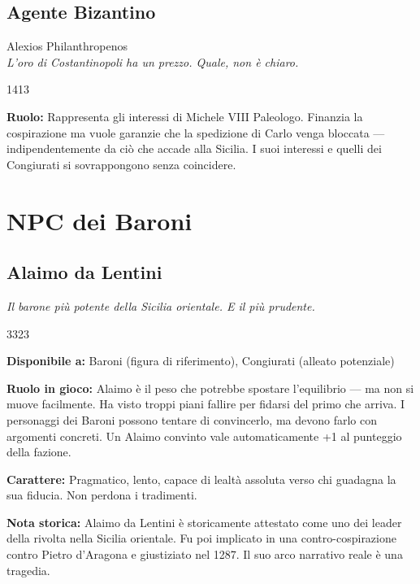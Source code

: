 \subsection{Agente Bizantino}
{\cinzel\footnotesize\color{grigionote} Alexios Philanthropenos}\\
\textit{L'oro di Costantinopoli ha un prezzo. Quale, non è chiaro.}

%
{1}{4}{1}{3}

\textbf{Ruolo:} Rappresenta gli interessi di Michele VIII Paleologo.
Finanzia la cospirazione ma vuole garanzie che la spedizione di Carlo
venga bloccata — indipendentemente da ciò che accade alla Sicilia.
I suoi interessi e quelli dei Congiurati si sovrappongono senza
coincidere.

\secsep

\section{NPC dei Baroni}

\subsection{Alaimo da Lentini}
\textit{Il barone più potente della Sicilia orientale. E il più prudente.}

%
{3}{3}{2}{3}

\textbf{Disponibile a:} Baroni (figura di riferimento), Congiurati
(alleato potenziale)

\textbf{Ruolo in gioco:} Alaimo è il peso che potrebbe spostare
l'equilibrio — ma non si muove facilmente. Ha visto troppi piani
fallire per fidarsi del primo che arriva. I personaggi dei Baroni
possono tentare di convincerlo, ma devono farlo con argomenti concreti.
Un Alaimo convinto vale automaticamente +1 al punteggio della fazione.

\textbf{Carattere:} Pragmatico, lento, capace di lealtà assoluta
verso chi guadagna la sua fiducia. Non perdona i tradimenti.

\textbf{Nota storica:} Alaimo da Lentini è storicamente attestato
come uno dei leader della rivolta nella Sicilia orientale. Fu poi
implicato in una contro-cospirazione contro Pietro d'Aragona e
giustiziato nel 1287. Il suo arco narrativo reale è una tragedia.


